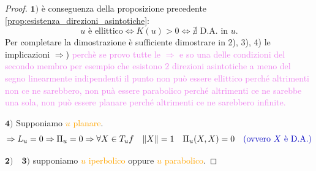         \begin{proof}
        \mbox{}

        $\mathbf{1)}$ è conseguenza della proposizione precedente \ref{prop:esistenza_direzioni_asintotiche}:
        \[
        u \text{ è ellittico} \iff K(u) > 0 \iff \nexists \text{ D.A. in } u.
        \]
        Per completare la dimostrazione è sufficiente dimostrare in 2), 3), 4) le implicazioni $\Rightarrow$)
        \textcolor{violet}{perchè se provo tutte le $\Rightarrow$ e so una delle condizioni del secondo membro per esempio che esistono $2$
        direzioni asintotiche a meno del segno linearmente indipendenti il punto non può essere ellittico perché altrimenti non ce ne sarebbero, non puà essere parabolico
        perché altrimenti ce ne sarebbe una sola, non può essere planare perché altrimenti ce ne sarebbero infinite.} 

        $\mathbf{4)}$ Supponiamo \textcolor{orange}{$u$ planare}.
        \[ \Rightarrow L_u=0 \Rightarrow \Pi_u = 0 \Rightarrow \forall X \in T_u f \quad \norm{X} = 1 \quad \Pi_u(X,X) = 0 \quad \textcolor{blu}{(\text{ovvero } X \text{ è D.A.})} \]

        $\mathbf{2) \quad 3)}$ supponiamo \textcolor{orange}{$u$ iperbolico} oppure \textcolor{orange}{$u$ parabolico}.


\end{proof}
